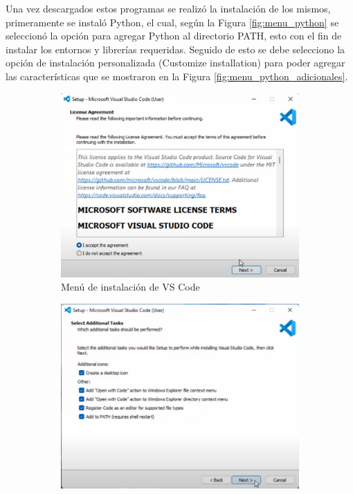 Una vez descargados estos programas se realizó la instalación de los mismos, primeramente se instaló Python, el cual, según la Figura \ref{fig:menu_python} se seleccionó la opción para agregar Python al directorio PATH, esto con el fin de instalar los entornos y librerías requeridas. Seguido de esto se debe selecciono la opción de instalación personalizada (Customize installation) para poder agregar las características que se mostraron en la Figura \ref{fig:menu_python_adicionales}. 
\newpage

\begin{figure}[htbp]
    \centering
    \begin{subfigure}[b]{0.45\textwidth}
        \centering
        \includegraphics[width=\textwidth]{fig/especifico_2/Ambiente_matlab/instalacion_vs_code.pdf}
        \caption{Menú de instalación de VS Code}
        \label{fig:menu_vscode}
    \end{subfigure}
    \hfill
    \begin{subfigure}[b]{0.45\textwidth}
        \centering
        \includegraphics[width=\textwidth]{fig/especifico_2/Ambiente_matlab/opciones_adicionales_vs_code.pdf}

\end{subfigure}
\end{figure}
